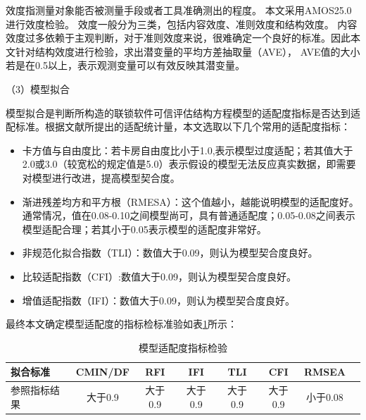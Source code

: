 效度指测量对象能否被测量手段或者工具准确测出的程度\cite{赵学金2009基于结构方程的知识型服务质量的评价方法}。
本文采用AMOS25.0进行效度检验。
效度一般分为三类，包括内容效度、准则效度和结构效度。
内容效度过多依赖于主观判断，对于准则效度来说，很难确定一个良好的标准。因此本文针对结构效度进行检验，求出潜变量的平均方差抽取量（AVE），
AVE值的大小若是在0.5以上，表示观测变量可以有效反映其潜变量。

（3）模型拟合

模型拟合是判断所构造的联锁软件可信评估结构方程模型的适配度指标是否达到适配标准。根据文献\cite{乔红丽2017移动图书馆用户体验的结构方程模型分析}所提出的适配统计量，本文选取以下几个常用的适配度指标：
\begin{itemize}
    \item 卡方值与自由度比：若卡房自由度比小于1.0,表示模型过度适配；若其值大于2.0或3.0（较宽松的规定值是5.0）表示假设的模型无法反应真实数据，即需要对模型进行改进，提高模型契合度。
    \item 渐进残差均方和平方根（RMESA）：这个值越小，越能说明模型的适配度好。通常情况，值在0.08-0.10之间模型尚可，具有普通适配度；0.05-0.08之间表示模型适配合理；若其小于0.05表示模型的适配度非常好。
    \item 非规范化拟合指数（TLI）：数值大于0.09，则认为模型契合度良好。
    \item 比较适配指数（CFI）:数值大于0.09，则认为模型契合度良好。
    \item 增值适配指数（IFI）：数值大于0.09，则认为模型契合度良好。
\end{itemize}
最终本文确定模型适配度的指标检标准验如表\ref{tab-3-2}所示：
\begin{table}[!ht]
	\centering
	\renewcommand\arraystretch{1.3}
	\caption{模型适配度指标检验}
	\begin{tabular}{|l|c|c|c|c|c|c|c|}
		\hline
		\textbf{拟合标准} & \textbf{CMIN/DF} & \textbf{RFI} & \textbf{IFI} & \textbf{TLI} & \textbf{CFI} & \textbf{RMSEA} \\
		\hline
		参照指标结果 & 大于0.9 & 大于0.9 & 大于0.9 & 大于0.9 & 大于0.9 & 小于0.08 \\
		\hline
	\end{tabular}
	\label{tab-3-2}
\end{table}

